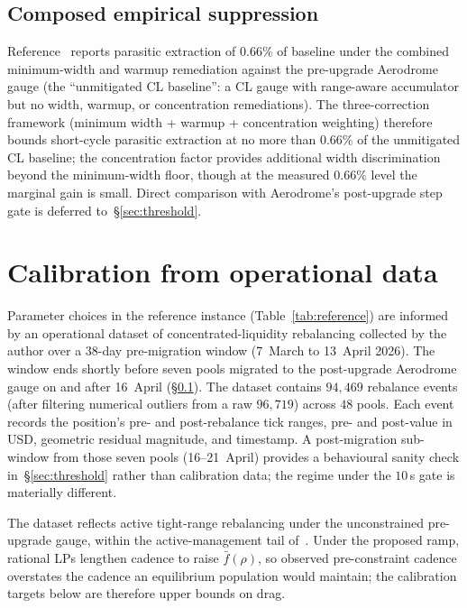 \documentclass[11pt,a4paper]{article}
\theoremstyle{cgdefinition}
\theoremstyle{cgplain}
\theoremstyle{cgremark}
\begin{document}
\subsection{Composed empirical suppression}\label{sec:composed}

Reference~\cite[\S5.3]{ryan2026c} reports parasitic extraction of $0.66\%$ of baseline under the combined minimum-width and warmup remediation against the pre-upgrade Aerodrome gauge (the ``unmitigated CL baseline'': a CL gauge with range-aware accumulator but no width, warmup, or concentration remediations). The three-correction framework (minimum width + warmup + concentration weighting) therefore bounds short-cycle parasitic extraction at no more than $0.66\%$ of the unmitigated CL baseline; the concentration factor provides additional width discrimination beyond the minimum-width floor, though at the measured $0.66\%$ level the marginal gain is small. Direct comparison with Aerodrome's post-upgrade step gate is deferred to~\S\ref{sec:threshold}.

\section{Calibration from operational data}\label{sec:calibration}

Parameter choices in the reference instance (Table~\ref{tab:reference}) are informed by an operational dataset of concentrated-liquidity rebalancing collected by the author over a 38-day pre-migration window (7~March to 13~April 2026). The window ends shortly before seven pools migrated to the post-upgrade Aerodrome gauge on and after 16~April (\S\ref{sec:composed}). The dataset contains $94{,}469$ rebalance events (after filtering numerical outliers from a raw $96{,}719$) across $48$ pools. Each event records the position's pre- and post-rebalance tick ranges, pre- and post-value in USD, geometric residual magnitude, and timestamp. A post-migration sub-window from those seven pools (16--21~April) provides a behavioural sanity check in~\S\ref{sec:threshold} rather than calibration data; the regime under the $10$\,s gate is materially different.

The dataset reflects active tight-range rebalancing under the unconstrained pre-upgrade gauge, within the active-management tail of~\cite{heimbach2022}. Under the proposed ramp, rational LPs lengthen cadence to raise $\bar f(\rho)$, so observed pre-constraint cadence overstates the cadence an equilibrium population would maintain; the calibration targets below are therefore upper bounds on drag.
\end{document}
